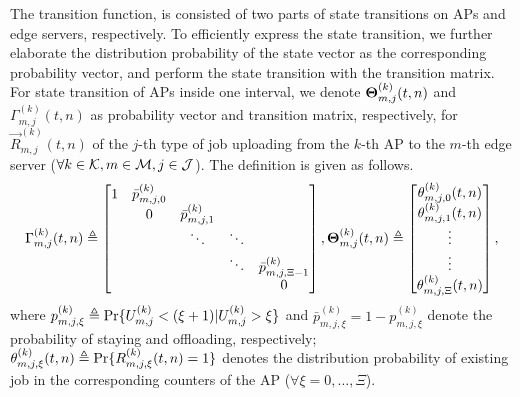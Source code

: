 The transition function,  is consisted of two parts of state transitions on APs and edge servers, respectively.
To efficiently express the state transition, we further elaborate the distribution probability of the state vector as the corresponding probability vector, and perform the state transition with the transition matrix.
For state transition of APs inside one interval, we denote $\boldsymbol{\Theta}^{(k)}_{m,j}(t,n)$ and ${\Gamma}^{(k)}_{m,j}(t,n)$ as probability vector and transition matrix, respectively, for $\vec{R}^{(k)}_{m,j}(t,n)$ of the $j$-th type of job uploading from the $k$-th AP to the $m$-th edge server ($\forall k\in\mathcal{K}, m\in\mathcal{M}, j\in\mathcal{J}$). The definition is given as follows.
\begin{align}
    \Gamma^{(k)}_{m,j}(t,n) \triangleq
    \begin{bmatrix}
        1 & \bar{p}^{(k)}_{m,j,0} &                       &        &                           \\
          & 0                     & \bar{p}^{(k)}_{m,j,1} &        &                           \\
          &                       & \ddots                & \ddots &                           \\
          &                       &                       & \ddots & \bar{p}^{(k)}_{m,j,\Xi-1} \\
          &                       &                       &        & 0                         \\
    \end{bmatrix},
    \boldsymbol{\Theta}^{(k)}_{m,j}(t,n) \triangleq
    \begin{bmatrix}
        \theta^{(k)}_{m,j,0}(t,n) \\
        \theta^{(k)}_{m,j,1}(t,n) \\
        \vdots \\
        \vdots \\
        \theta^{(k)}_{m,j,\Xi}(t,n)
    \end{bmatrix},
\end{align}
where $p^{(k)}_{m,j,\xi} \triangleq \Pr\{U^{(k)}_{m,j} < (\xi+1) | U^{(k)}_{m,j}>\xi\}$ and $\bar{p}^{(k)}_{m,j,\xi} = 1 - p^{(k)}_{m,j,\xi}$ denote the probability of staying and offloading, respectively; $\theta^{(k)}_{m,j,\xi}(t,n) \triangleq \Pr\{R^{(k)}_{m,j,\xi}(t,n) = 1\}$ denotes the distribution probability of existing job in the corresponding counters of the AP ($\forall \xi=0,\dots,\Xi$).

